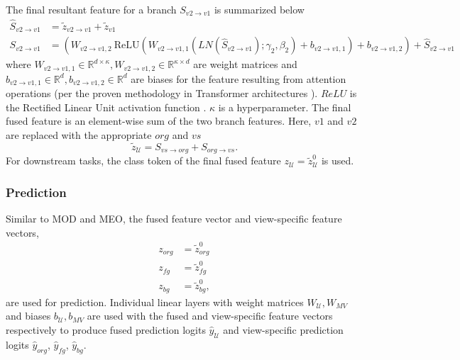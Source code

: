The final resultant feature for a branch $S_{v2 \rightarrow v1}$ is summarized below
\begin{equation}
\begin{split}
    \hat{S}_{v2 \rightarrow v1} & =  \tilde{z}_{v2 \rightarrow v1} + \tilde{z}_{v1} \\
    S_{v2 \rightarrow v1} & = (W_{v2 \rightarrow v1,2}\ \text{ReLU}(W_{v2 \rightarrow v1,1} (LN(\hat{S}_{v2 \rightarrow v1}); \gamma_2, \beta_2) + b_{v2 \rightarrow v1,1}) + b_{v2 \rightarrow v1,2}) + \hat{S}_{v2 \rightarrow v1}
\end{split}
\end{equation}
where $W_{v2 \rightarrow v1,1} \in \mathbb{R}^{d \times \kappa}, W_{v2 \rightarrow v1,2} \in \mathbb{R}^{\kappa \times d}$ are weight matrices and $b_{v2 \rightarrow v1,1} \in \mathbb{R}^{d}, b_{v2 \rightarrow v1,2} \in \mathbb{R}^{d}$ are biases for the feature resulting from attention operations (per the proven methodology in Transformer architectures \cite{vaswani2017attention}). $ReLU$ is the Rectified Linear Unit activation function \cite{ramachandran2017searching}. $\kappa$ is a hyperparameter.
The final fused feature is an element-wise sum of the two branch features. Here, $v1$ and $v2$ are replaced with the appropriate $org$ and $vs$
\begin{equation}
    \tilde{z}_{\mathcal{U}} = S_{vs \rightarrow org} + S_{org \rightarrow vs}.
\end{equation}
For downstream tasks, the class token of the final fused feature $z_{\mathcal{U}} = \tilde{z}_{\mathcal{U}}^{0}$ is used.

\subsubsection{Prediction} 
Similar to MOD and MEO, the fused feature vector and view-specific feature vectors,
\begin{equation}
\begin{aligned}
    z_{org} & = \tilde{z}_{org}^{0} \\
    z_{fg} & = \tilde{z}_{fg}^{0} \\
    z_{bg} & = \tilde{z}_{bg}^{0},
\end{aligned}
\end{equation}
are used for prediction. Individual linear layers with weight matrices $W_{\mathcal{U}}, W_{MV}$ and biases $b_{\mathcal{U}}, b_{MV}$ are used with the fused and view-specific feature vectors respectively to produce fused prediction logits $\hat{y}_{\mathcal{U}}$ and view-specific prediction logits $\hat{y}_{org}$, $\hat{y}_{fg}$, $\hat{y}_{bg}$.

